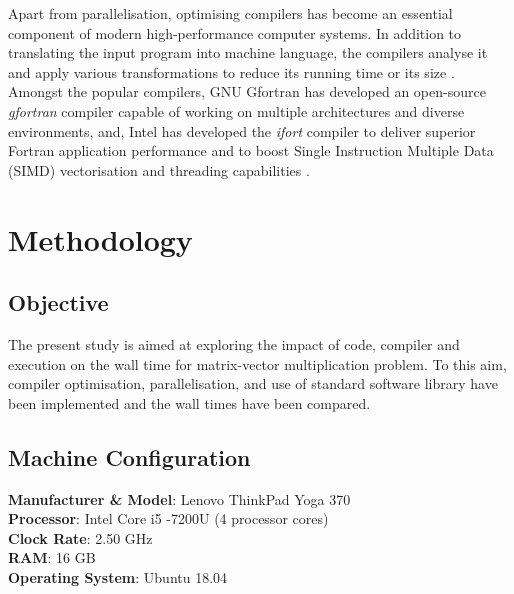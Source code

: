 \documentclass[11pt, oneside]{article}   	%
\begin{document}
Apart from parallelisation, optimising compilers has become an essential component of modern high-performance computer systems. In addition to translating the input program into machine language, the compilers analyse it and apply various transformations to reduce its running time or its size \cite{Bacon:1994aa}. Amongst the popular compilers, GNU Gfortran has developed an open-source \textit{gfortran} compiler capable of working on multiple architectures and diverse environments, and, Intel has developed the \textit{ifort} compiler to deliver superior Fortran application performance and to boost Single Instruction Multiple Data (SIMD) vectorisation and threading capabilities \cite{Corporation:2018aa}.

\section{Methodology}
\subsection{Objective}
The present study is aimed at exploring the impact of code, compiler and execution on the wall time for matrix-vector multiplication problem. To this aim, compiler optimisation, parallelisation, and use of standard software library have been implemented and the wall times have been compared.

\subsection{Machine Configuration}
	\textbf{Manufacturer \& Model}: Lenovo ThinkPad Yoga 370\\
	\textbf{Processor}: Intel Core i5 -7200U (4 processor cores)\\
	\textbf{Clock Rate}:  2.50 GHz\\
	\textbf{RAM}:  16 GB\\
	\textbf{Operating System}: Ubuntu 18.04\\
	
\end{document}
